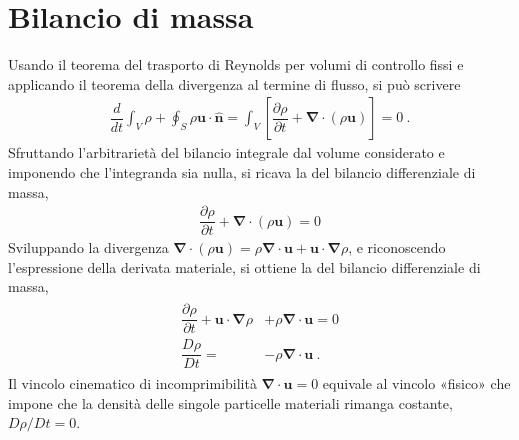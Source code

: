 \documentclass[letterpaper,10pt,italian]{jupyterBook}
\begin{document}
\section{Bilancio di massa}
\label{\detokenize{polimi/fluidmechanics-ita/template/capitoli/04_bilanci/04teoria:id1}}
\sphinxAtStartPar
Usando il teorema del trasporto di Reynolds per volumi di controllo
fissi e applicando il teorema della divergenza al termine di flusso, si
può scrivere
\begin{equation*}
\begin{split}\dfrac{d}{d t} \displaystyle\int_{V} \rho + \oint_{S} \rho \mathbf{u} \cdot \mathbf{\hat{n}} = \int_V \left[ \dfrac{\partial \rho}{\partial t} + \mathbf{\nabla} \cdot (\rho \mathbf{u})\right] = 0 \ .\end{split}
\end{equation*}
\sphinxAtStartPar
Sfruttando l’arbitrarietà del bilancio integrale dal volume considerato
e imponendo che l’integranda sia nulla, si ricava la  del bilancio differenziale di massa,
\begin{equation*}
\begin{split}\dfrac{\partial \rho}{\partial t} + \mathbf{\nabla} \cdot (\rho \mathbf{u}) = 0\end{split}
\end{equation*}
\sphinxAtStartPar
Sviluppando la divergenza
\(\mathbf{\nabla} \cdot (\rho \mathbf{u}) = \rho \mathbf{\nabla} \cdot \mathbf{u} + \mathbf{u} \cdot \mathbf{\nabla} \rho\),
e riconoscendo l’espressione della derivata materiale, si ottiene la
 del bilancio differenziale di massa,
\begin{equation*}
\begin{split}\begin{aligned}
 \dfrac{\partial \rho}{\partial t} + \mathbf{u} \cdot \mathbf{\nabla} \rho &+ \rho \mathbf{\nabla} \cdot \mathbf{u} = 0 \\ 
 \dfrac{D \rho}{D t} = &- \rho \mathbf{\nabla} \cdot \mathbf{u} \ .
\end{aligned}\end{split}
\end{equation*}
\sphinxAtStartPar
Il vincolo cinematico di incomprimibilità \(\mathbf{\nabla} \cdot \mathbf{u} = 0\)
equivale al vincolo «fisico» che impone che la densità delle singole
particelle materiali rimanga costante, \(D\rho/Dt = 0\).
\end{document}

